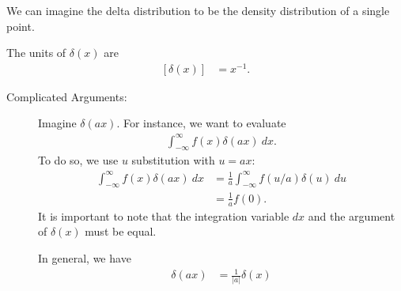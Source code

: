\documentclass[10pt]{mypackage}
\begin{document}
We can imagine the delta distribution to be the density distribution of a single point.\newline

The units of $\delta(x)$ are
\begin{align*}
  \left[\delta(x)\right] &= x^{-1}.
\end{align*}
\begin{description}
  \item[Complicated Arguments:] Imagine $\delta\left(ax\right)$. For instance, we want to evaluate
    \begin{align*}
      \int_{-\infty}^{\infty} f(x)\delta(ax)\:dx.
    \end{align*}
    To do so, we use $u$ substitution with $u = ax$:
    \begin{align*}
      \int_{-\infty}^{\infty} f(x)\delta\left(ax\right)\:dx &= \frac{1}{a}\int_{-\infty}^{\infty} f\left(u/a\right)\delta(u)\:du\\
                                                            &= \frac{1}{a}f(0).
    \end{align*}
    It is important to note that the integration variable $dx$ and the argument of $\delta(x)$ must be equal.\newline

    In general, we have
    \begin{align*}
      \delta(ax) &= \frac{1}{|a|}\delta(x)
    \end{align*}
\end{description}
\end{document}
